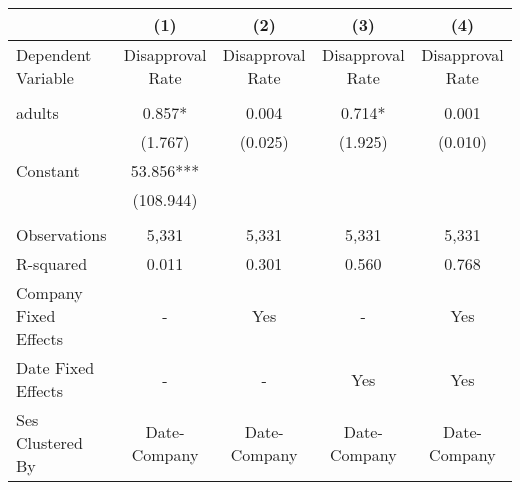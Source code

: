 \begin{tabular}{lcccc}
\toprule
{} &               (1) &               (2) &               (3) &               (4) \\
\midrule
Dependent Variable    &  Disapproval Rate &  Disapproval Rate &  Disapproval Rate &  Disapproval Rate \\
                      &                   &                   &                   &                   \\
adults                &            0.857* &             0.004 &            0.714* &             0.001 \\
                      &           (1.767) &           (0.025) &           (1.925) &           (0.010) \\
Constant              &         53.856*** &                   &                   &                   \\
                      &         (108.944) &                   &                   &                   \\
                      &                   &                   &                   &                   \\
Observations          &             5,331 &             5,331 &             5,331 &             5,331 \\
R-squared             &             0.011 &             0.301 &             0.560 &             0.768 \\
Company Fixed Effects &                 - &               Yes &                 - &               Yes \\
Date Fixed Effects    &                 - &                 - &               Yes &               Yes \\
Ses Clustered By      &      Date-Company &      Date-Company &      Date-Company &      Date-Company \\
\bottomrule
\end{tabular}
